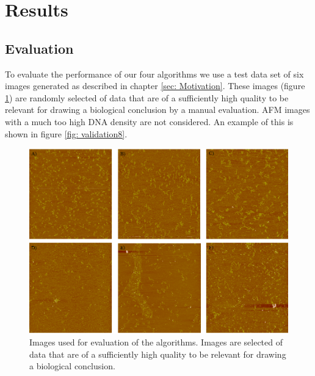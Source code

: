 \documentclass{article}
\begin{document}
\newpage
\section{Results}\label{sec: Results}
\subsection{Evaluation}\label{sec:Evalution}

To evaluate the performance of our four algorithms we use a test data set of six images generated as described in chapter \ref{sec: Motivation}. These images (figure \ref{fig: validation1}) are randomly selected of data that are of a sufficiently high quality to be relevant for drawing a biological conclusion by a manual evaluation. AFM images with a much too high DNA density are not considered. An example of this is shown in figure \ref{fig: validation8}.
%
\begin{figure}[!htb]
	\begin{center}
		\includegraphics[width = 1 \textwidth]{validation1}
	\end{center}
	\caption{Images used for evaluation of the algorithms. Images are selected of data that are of a sufficiently high quality to be relevant for drawing a biological conclusion.}
	\label{fig: validation1} %
\end{figure}
%
\end{document}
